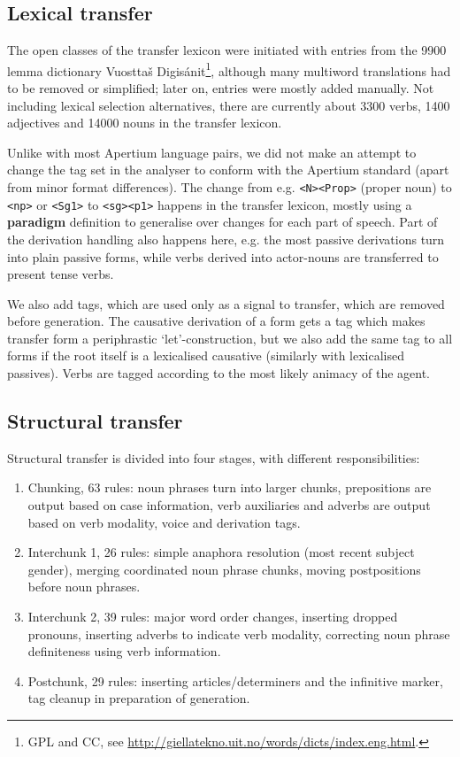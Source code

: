 \subsection{Lexical transfer}
The open classes of the transfer lexicon were initiated with entries
from the 9900 lemma dictionary Vuosttaš Digis\'{a}nit\footnote{GPL and CC,
  see
  \href{http://giellatekno.uit.no/words/dicts/index.eng.html}{http://giellatekno.uit.no/words/dicts/index.eng.html}.},
although many multiword translations had to be removed or simplified;
later on, entries were mostly added manually. Not including lexical
selection alternatives, there are currently about 3300 verbs, 1400
adjectives and 14000 nouns in the transfer lexicon.

Unlike with most Apertium language pairs, we did not make an attempt
to change the tag set in the analyser to conform with the Apertium
standard (apart from minor format differences). The change from e.g.
\texttt{<N><Prop>} (proper noun) to \texttt{<np>} or \texttt{<Sg1>} to
\texttt{<sg><p1>} happens in the transfer lexicon, mostly using a
\textbf{paradigm} definition to generalise over changes for each part
of speech. Part of the derivation handling also happens here, e.g. the
most passive derivations turn into plain passive forms, while verbs
derived into actor-nouns are transferred to present tense verbs.

We also add tags, which are used only as a signal to transfer, which
are removed before generation. The causative derivation of a form gets
a tag which makes transfer form a periphrastic `let'-construction, but
we also add the same tag to all forms if the root itself is a
lexicalised causative (similarly with lexicalised passives). Verbs are
tagged according to the most likely animacy of the agent.

\subsection{Structural transfer}
\label{sec:structural-transfer}
Structural transfer is divided into four stages, with different
responsibilities:

\begin{enumerate}

\item Chunking, 63 rules: noun phrases turn into larger chunks,
  prepositions are output based on case information, verb auxiliaries
  and adverbs are output based on verb modality, voice and derivation
  tags.

\item Interchunk 1, 26 rules: simple anaphora resolution (most recent
  subject gender), merging coordinated noun phrase chunks, moving
  postpositions before noun phrases.

\item Interchunk 2, 39 rules: major word order changes, inserting
  dropped pronouns, inserting adverbs to indicate verb modality,
  correcting noun phrase definiteness using verb information.

\item Postchunk, 29 rules: inserting articles/determiners and the
  infinitive marker, tag cleanup in preparation of generation.
\end{enumerate}

